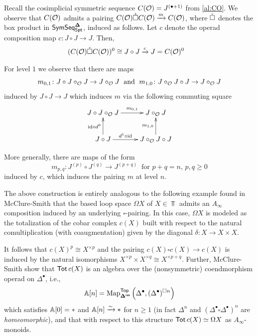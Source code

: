 \begin{example} \label{ex:C(O)-box}
Recall the cosimplicial symmetric sequence $C(\mathcal{O})=J^{(\bullet+1)}$ from \eqref{al:CO}. We observe that $C(\mathcal{O})$ admits a pairing $C(\mathcal{O}) \mathring{\square} C(\mathcal{O}) \xrightarrow{m} C(\mathcal{O})$, where $\mathring{\square}$ denotes the box product in $\mathsf{SymSeq}^{\mathbf{\Delta}}_{\mathsf{Spt}}$, induced as follows. Let $c$ denote the operad composition map $c\colon J\circ J\to J$. Then, \begin{align*} 
    &(C(\mathcal{O}) \mathring{\square} C(\mathcal{O}))^0\cong J \circ J \xrightarrow{c} J=C(\mathcal{O})^0 \end{align*}
    
For level $1$ we observe that there are maps \[ m_{0,1} \colon J\circ J\circ_{\mathcal{O}} J \to J\circ_{\mathcal{O}} J \; \text{ and } \; m_{1,0} \colon J \circ_{\mathcal{O}} J \circ J \to J\circ_{\mathcal{O}} J \]
induced by $J\circ J\to J$ which induces $m$ via the following commuting square
\begin{equation}\xymatrix{
    J \circ J\circ_{\Cal{O}} J \ar[r]^-{m_{0,1}}
    & 
    J \circ_{\Cal{O}} J 
    \\
    J \circ J \ar[u]^-{\id\circ  d^0} \ar[r]^-{d^1\circ \id}
    &
    J\circ_{\Cal{O}} J\circ J \ar[u]^-{m_{1,0}}
} 
\end{equation}

More generally, there are maps of the form \[m_{p,q}\colon J^{(p)} \circ J^{(q)} \to J^{(p+q)} \;\; \text{for $p+q=n$, $p,q\geq 0$}\] induced by $c$, which induces the pairing $m$ at level $n$. 
\end{example}

\begin{remark}
    The above construction is entirely analogous to the following example found in McClure-Smith \cite{MS-box} that the based loop space $\Omega X$ of $X\in \Top$ admits an $A_{\infty}$ composition induced by an underlying $\square$-pairing. In this case, $\Omega X$ is modeled as the totalization of the cobar complex $c(X)$ built with respect to the natural comultiplication (with coaugmentation) given by the diagonal $\delta\colon X\to X\times X$. 
    
    It follows that $c(X)^{p}\cong X^{\times p}$ and the pairing $c(X)\square c(X)\to c(X)$ is induced by the natural isomorphisms $X^{\times p}\times X^{\times q}\cong X^{\times p+q}$. Further, McClure-Smith  show that $\operatorname{\mathsf{Tot}} c(X)$ is an algebra over the (nonsymmetric) coendmorphism operad on $\Delta^{\bullet}$, i.e., \[ \mathbb{A}[n]=\operatorname{Map}_{\mathbf{\Delta}^{\mathsf{res}}}^{\mathsf{Top}}\left(\Delta^{\bullet}, (\Delta^{\bullet})^{\square n} \right)\] which satisfies $\mathbb{A}[0]=*$ and $\mathbb{A}[n]\xrightarrow{\sim} *$ for $n\geq 1$ (in fact $\Delta^n$ and $(\Delta^{\bullet} \square \Delta^{\bullet})^n$ are \textit{homeomorphic}), and that with respect to this structure $\operatorname{\mathsf{Tot}} c(X)\simeq \Omega X$ as $A_{\infty}$-monoids.  \label{ex:loop-space-A-infty-monoid}
\end{remark}


